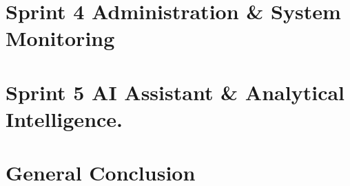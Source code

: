\documentclass[12pt,a4paper]{report}
\begin{document}
\chapter{Sprint 4 Administration \& System Monitoring}
\graphicspath{{./media/MES_Sprint-4-Report/}}
\minitoc
\newpage


\chapter{Sprint 5 AI Assistant \& Analytical Intelligence.}
\graphicspath{{./media/MES_Sprint-5-Report/}}
\minitoc
\newpage




\chapter*{General Conclusion}
\end{document}
